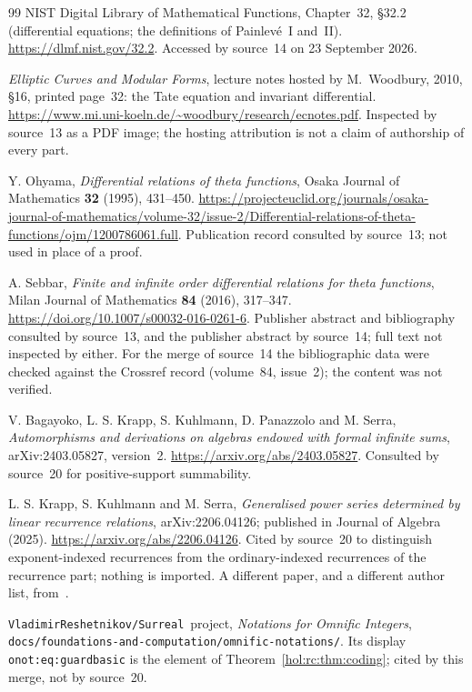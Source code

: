 \documentclass[11pt]{article}
\numberwithin{equation}{section}
\theoremstyle{definition}
\theoremstyle{remark}
\newcommand{\repo}{\texttt{VladimirReshetnikov/Surreal}}
\begin{document}
\begin{thebibliography}{99}
NIST Digital Library of Mathematical Functions, Chapter~32, \S32.2
(differential equations; the definitions of Painlev\'e~I and~II).
\url{https://dlmf.nist.gov/32.2}. Accessed by source~14 on 23 September 2026.

\emph{Elliptic Curves and Modular Forms}, lecture notes hosted by
M.~Woodbury, 2010, \S16, printed page~32: the Tate equation and invariant
differential.
\url{https://www.mi.uni-koeln.de/~woodbury/research/ecnotes.pdf}.
Inspected by source~13 as a PDF image; the hosting attribution is not a claim
of authorship of every part.

Y. Ohyama,
\emph{Differential relations of theta functions},
Osaka Journal of Mathematics \textbf{32} (1995), 431--450.
\url{https://projecteuclid.org/journals/osaka-journal-of-mathematics/volume-32/issue-2/Differential-relations-of-theta-functions/ojm/1200786061.full}.
Publication record consulted by source~13; not used in place of a proof.

A. Sebbar,
\emph{Finite and infinite order differential relations for theta functions},
Milan Journal of Mathematics \textbf{84} (2016), 317--347.
\url{https://doi.org/10.1007/s00032-016-0261-6}.
Publisher abstract and bibliography consulted by source~13, and the
publisher abstract by source~14; full text not inspected by either. For the
merge of source~14 the bibliographic data were checked against the Crossref
record (volume~84, issue~2); the content was not verified.

V. Bagayoko, L. S. Krapp, S. Kuhlmann, D. Panazzolo and M. Serra,
\emph{Automorphisms and derivations on algebras endowed with formal infinite
sums}, arXiv:2403.05827, version~2.
\url{https://arxiv.org/abs/2403.05827}.
Consulted by source~20 for positive-support summability.

L. S. Krapp, S. Kuhlmann and M. Serra,
\emph{Generalised power series determined by linear recurrence relations},
arXiv:2206.04126; published in Journal of Algebra (2025).
\url{https://arxiv.org/abs/2206.04126}.
Cited by source~20 to distinguish exponent-indexed recurrences from the
ordinary-indexed recurrences of the recurrence part; nothing is imported. A
different paper, and a different author list, from~\cite{kks}.

\repo\ project, \emph{Notations for Omnific Integers},
\texttt{docs/foundations-and-computation/omnific-notations/}. Its display
\texttt{onot:eq:guardbasic} is the element of Theorem~\ref{hol:rc:thm:coding};
cited by this merge, not by source~20.

\end{thebibliography}
\end{document}
